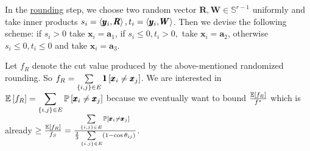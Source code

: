 
In the \underline{rounding} step, we choose two random vector $\pmb R, \pmb W \in \mathbb S^{r-1}$ uniformly and take inner products $s_{i} = \left\langle \pmb y_{i}, \pmb R \right\rangle, t_{i} = \left\langle \pmb y_{i}, \pmb W \right\rangle$. Then we devise the following scheme: if $s_{i} > 0$ take $\pmb x_{i}=\pmb a_{1}$, if $s_{i} \le 0, t_{i}>0,$ take $\pmb x_{i}=\pmb a_{2}$, otherwise $s_{i}\le 0, t_{i}\le 0$ and take $\pmb x_{i}=\pmb a_{3}$.

Let $f_{R}$ denote the cut value produced by the above-mentioned randomized rounding. So $f_{R} = \sum\limits_{\left\{i,j\right\}\in E} \pmb 1\left[\pmb x_{i}\ne \pmb x_{j}\right]$. We are interested in $\displaystyle \mathbb E\left[ f_{R} \right] = \sum\limits_{\left\{i,j\right\}\in E} \mathbb P\left[ \pmb x_{i}\ne \pmb x_{j} \right]$ because we eventually want to bound $\frac{\mathbb E\left[ f_{R} \right]}{f^{*}}$ which is already $\ge \frac{\mathbb E\left[ f_{R} \right]}{f_{S}} = \frac{\sum\limits_{\left\{i,j\right\}\in E}\mathbb P\left[ \pmb x_{i}\ne \pmb x_{j} \right]}{\frac23 \sum\limits_{\left\{i,j\right\}\in E} (1-\cos\theta_{ij})}$. 


